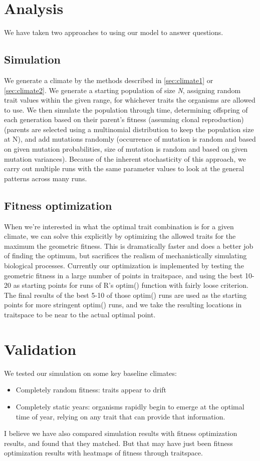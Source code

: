 \documentclass[11pt,a4paper]{article}
\begin{document}
\section{Analysis}
We have taken two approaches to using our model to answer questions.

\subsection{Simulation}
We generate a climate by the methods described in \ref{sec:climate1} or \ref{sec:climate2}. We generate a starting population of size \textit{N}, assigning random trait values within the given range, for whichever traits the organisms are allowed to use. We then simulate the population through time, determining offspring of each generation based on their parent's fitness (assuming clonal reproduction) (parents are selected using a multinomial distribution to keep the population size at N), and add mutations randomly (occurrence of mutation is random and based on given mutation probabilities, size of mutation is random and based on given mutation variances). Because of the inherent stochasticity of this approach, we carry out multiple runs with the same parameter values to look at the general patterns across many runs.
\subsection{Fitness optimization}
When we're interested in what the optimal trait combination is for a given climate, we can solve this explicitly by optimizing the allowed traits for the maximum the geometric fitness. This is dramatically faster and does a better job of finding the optimum, but sacrifices the realism of mechanistically simulating biological processes. Currently our optimization is implemented by testing the geometric fitness in a large number of points in traitspace, and using the best 10-20 as starting points for runs of R's optim() function with fairly loose criterion. The final results of the best 5-10 of those optim() runs are used as the starting points for more stringent optim() runs, and we take the resulting locations in traitspace to be near to the actual optimal point. 

\section{Validation}
We tested our simulation on some key baseline climates:
\begin{itemize}
  \item Completely random fitness: traits appear to drift
  \item Completely static years: organisms rapidly begin to emerge at the optimal time of year, relying on any trait that can provide that information.
\end{itemize}
I believe we have also compared simulation results with fitness optimization results, and found that they matched. But that may have just been fitness optimization results with heatmaps of fitness through traitspace.
\end{document}
